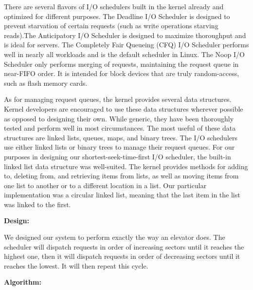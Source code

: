 \documentclass[letterpaper,10pt,titlepage]{article}
\newcommand{\ignore}[2]{\hspace{0in}#2} %
\newcommand{\tab}{\hspace*{2em}} %
\begin{document}
\begin{enumerate}
\tab There are several flavors of I/O schedulers built in the kernel already and optimized for different purposes. The Deadline I/O Scheduler is designed to prevent starvation of certain requests (such as write operations starving reads).\ignore{[Source: Book pg. 300]} The Anticipatory I/O Scheduler is designed to maximize thoroughput and is ideal for servers\ignore{[Source: Book pg. 303]}. The Completely Fair Queueing (CFQ) I/O Scheduler performs well in nearly all workloads and is the default scheduler in Linux\ignore{[Source: Book pg. 303]}. The Noop I/O Scheduler only performs merging of requests, maintaining the request queue in near-FIFO order. It is intended for block devices that are truly random-access, such as flash memory cards\ignore{[Source: Book pg. 304]}.

\tab As for managing request queues, the kernel provides several data structures. Kernel developers are encouraged to use these data structures wherever possible as opposed to designing their own. While generic, they have been thoroughly tested and perform well in most circumstances. The most useful of these data structures are linked lists, queues, maps, and binary trees. The I/O schedulers use either linked lists or binary trees to manage their request queues. For our purposes in designing our shortest-seek-time-first I/O scheduler, the built-in linked list data structure was well-suited. The kernel provides methods for adding to, deleting from, and retrieving items from lists, as well as moving items from one list to another or to a different location in a list. Our particular implementation was a circular linked list, meaning that the last item in the list was linked to the first.

\tab \textbf{Design:} 

\tab We designed our system to perform exactly the way an elevator does. The scheduler will dispatch requests in order of increasing sectors until it reaches the highest one, then it will dispatch requests in order of decreasing sectors until it reaches the lowest. It will then repeat this cycle.

\tab \textbf{Algorithm:} 


\end{enumerate}
\end{document}
